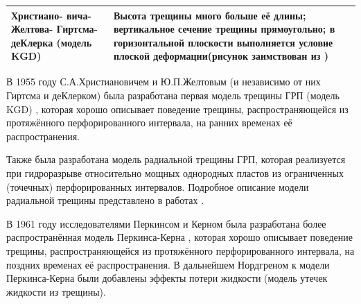 \begin{longtable}[l]{|L{2.2cm}|m{7.3cm}|L{6.2cm}|}
	Христиано- вича- Желтова- Гиртсма- деКлерка (модель KGD)&Высота трещины много больше её длины; вертикальное сечение трещины прямоугольно; в горизонтальной плоскости выполняется условие плоской деформации\break\hfill\break (рисунок заимствован из \cite{adachi})&\hfill\break{}\hfill\break\\ \hline
	
\end{longtable}
\normalsize%
\endgroup

В 1955 году С.А.Христиановичем и Ю.П.Желтовым (и независимо от них Гиртсма и деКлерком) была разработана первая модель трещины ГРП (модель KGD) \cite{khristianovic_zheltov}, которая хорошо описывает поведение трещины, распространяющейся из протяжённого перфорированного интервала, на ранних временах её распространения.

Также была разработана модель радиальной трещины ГРП, которая реализуется при гидроразрыве относительно мощных однородных пластов из ограниченных (точечных) перфорированных интервалов.
Подробное описание модели радиальной трещины представлено в работах \cite{madyarova,savitski}.

В 1961 году исследователями Перкинсом и Керном была разработана более распространённая модель Перкинса-Керна \cite{perkins_kern}, которая хорошо описывает поведение трещины, распространяющейся из протяжённого перфорированного интервала, на поздних временах её распространения.
В дальнейшем Нордгреном \cite{nordgren} к модели Перкинса-Керна были добавлены эффекты потери жидкости (модель утечек жидкости из трещины).

